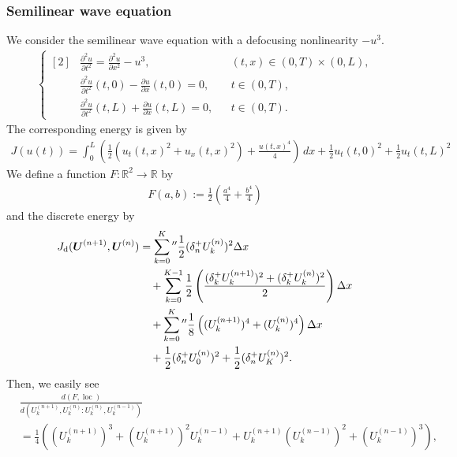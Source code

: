 \documentclass[dvipdfmx-if-dvi,autodetect-engine,ja=standard]{amsart}
\numberwithin{equation}{section} %
\def\vect#1{\mbox{\boldmath $#1$}} %
\DeclareMathOperator{\loc}{loc}
\begin{document}
\subsubsection{Semilinear wave equation}
We consider the semilinear wave equation
with a defocusing nonlinearity
$-u^3$.
\begin{align}\label{eq:sdw:example:-u^3}
    \left\{ \begin{aligned}[2]
    &\frac{\partial^2 u}{\partial t^2} = \frac{\partial^2 u}{\partial x^2} - u^3,
    &&(t,x) \in (0,T)\times (0,L),\\
    &\frac{\partial^2 u}{\partial t^2}(t,0)
    - \frac{\partial u}{\partial x}(t,0) = 0,
    &&t\in (0,T),\\
    &\frac{\partial^2 u}{\partial t^2}(t,L)
    + \frac{\partial u}{\partial x}(t,L) = 0,
    &&t\in (0,T).
    \end{aligned}\right.
\end{align}
The corresponding energy is given by
\begin{align}
    J(u(t)) = \int_0^L \left( 
    \frac{1}{2}
    \left( u_t(t,x)^2 + u_x(t,x)^2 \right) + \frac{u(t,x)^4}{4}
    \right) \,dx
    + \frac{1}{2}u_t(t,0)^2 + \frac{1}{2}u_t(t,L)^2
\end{align}
We define a function
$F: \mathbb{R}^2 \to \mathbb{R}$
by
\begin{align}
    F(a,b) := \frac{1}{2} \left( \frac{a^4}{4} + \frac{b^4}{4} \right)
\end{align}
and the discrete energy by
\begin{align}
    J_{\mathrm{d}} (\vect{U}^{(n+1)}, \vect{U}^{(n)})
    &=
    \sum_{k=0}^K{}'' \frac{1}{2} (\delta_n^+ U_k^{(n)})^2 \Delta x \\
    &\quad +
    \sum_{k=0}^{K-1} 
    \frac{1}{2}
    \left(
        \frac{(\delta_k^+ U_k^{(n+1)})^2 + (\delta_k^+ U_k^{(n)})^2}{2}
    \right)
    \Delta x \\
    &\quad + \sum_{k=0}^K{}'' \frac{1}{8}\left( (U_k^{(n+1)})^4 + (U_k^{(n)})^4 \right) \Delta x \\
    &\quad
    + \frac{1}{2} (\delta_n^+ U_0^{(n)})^2
    + \frac{1}{2} (\delta_n^+ U_K^{(n)})^2.
\end{align}
Then, we easily see
\begin{align}
    &\frac{d(F,\loc)}{d(U_k^{(n+1)}, U_k^{(n)} : U_k^{(n)}, U_k^{(n-1)})} \\
    &=
    \frac{1}{4}
    \left(
    (U_k^{(n+1)})^3 + (U_k^{(n+1)})^2 U_k^{(n-1)} + U_k^{(n+1)} (U_k^{(n-1)})^2 + (U_k^{(n-1)})^3
    \right),
\end{align}
\end{document}
